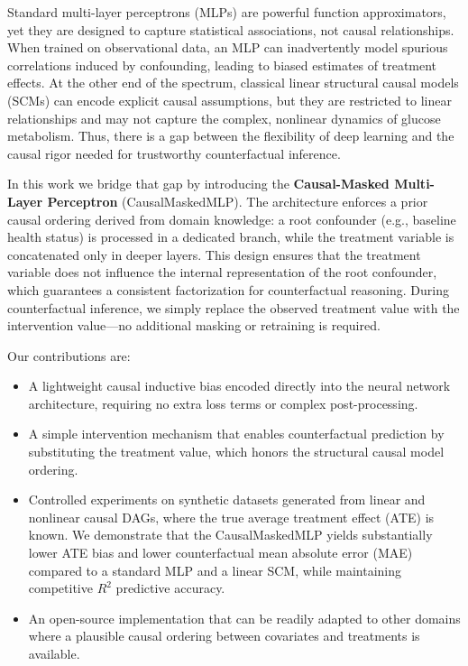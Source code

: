 \documentclass[11pt,a4paper]{article}
\begin{document}
Standard multi-layer perceptrons (MLPs) are powerful function approximators, yet they are designed to capture statistical associations, not causal relationships. When trained on observational data, an MLP can inadvertently model spurious correlations induced by confounding, leading to biased estimates of treatment effects. At the other end of the spectrum, classical linear structural causal models (SCMs) can encode explicit causal assumptions, but they are restricted to linear relationships and may not capture the complex, nonlinear dynamics of glucose metabolism. Thus, there is a gap between the flexibility of deep learning and the causal rigor needed for trustworthy counterfactual inference.

In this work we bridge that gap by introducing the \textbf{Causal-Masked Multi-Layer Perceptron} (CausalMaskedMLP). The architecture enforces a prior causal ordering derived from domain knowledge: a root confounder (e.g., baseline health status) is processed in a dedicated branch, while the treatment variable is concatenated only in deeper layers. This design ensures that the treatment variable does not influence the internal representation of the root confounder, which guarantees a consistent factorization for counterfactual reasoning. During counterfactual inference, we simply replace the observed treatment value with the intervention value—no additional masking or retraining is required.

Our contributions are:
\begin{itemize}
    \item A lightweight causal inductive bias encoded directly into the neural network architecture, requiring no extra loss terms or complex post-processing.
    \item A simple intervention mechanism that enables counterfactual prediction by substituting the treatment value, which honors the structural causal model ordering.
    \item Controlled experiments on synthetic datasets generated from linear and nonlinear causal DAGs, where the true average treatment effect (ATE) is known. We demonstrate that the CausalMaskedMLP yields substantially lower ATE bias and lower counterfactual mean absolute error (MAE) compared to a standard MLP and a linear SCM, while maintaining competitive $R^2$ predictive accuracy.
    \item An open-source implementation that can be readily adapted to other domains where a plausible causal ordering between covariates and treatments is available.
\end{itemize}
\end{document}
